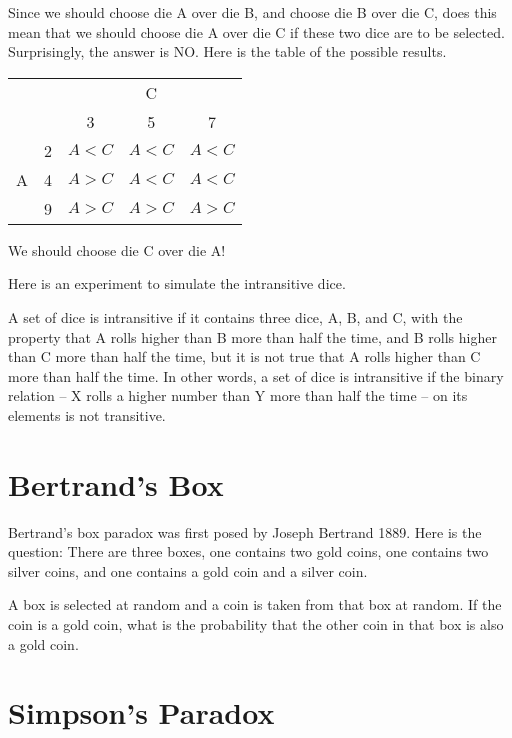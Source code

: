 Since we should choose die A over die B, and choose die B over die C, does this
mean that we should choose die A over die C if these two dice are to be
selected. Surprisingly, the answer is NO. Here is the table of the possible
results.
\begin{center}
  \begin{tabular}{cc|ccc}\hline
    &   & \multicolumn{3}{c}{C} \\
    &   & 3                & 5                & 7                \\ \hline
    \multirow{3}{*}{A}
    & 2 & $A<C$            & $A<C$            & $A<C$            \\
    & 4 & \color{red}$A>C$ & $A<C$            & $A<C$            \\
    & 9 & \color{red}$A>C$ & \color{red}$A>C$ & \color{red}$A>C$ \\\hline
  \end{tabular}
\end{center}
We should choose die C over die A!

Here is an experiment to simulate the intransitive dice.



A set of dice is intransitive if it contains three dice, A, B, and C, with the
property that A rolls higher than B more than half the time, and B rolls higher
than C more than half the time, but it is not true that A rolls higher than C
more than half the time. In other words, a set of dice is intransitive if the
binary relation – X rolls a higher number than Y more than half the time – on
its elements is not transitive.

\hypertarget{Bertrand-Box}{%
\section{Bertrand's Box}\label{Bertrand-Box}}

Bertrand's box paradox was first posed by Joseph Bertrand 1889. Here is the
question: There are three boxes, one contains two gold coins, one contains two
silver coins, and one contains a gold coin and a silver coin.

A box is selected at random and a coin is taken from that box at random. If the
coin is a gold coin, what is the probability that the other coin in that box is
also a gold coin.




\hypertarget{simpsons-paradox}{%
\section{Simpson's Paradox}\label{simpsons-paradox}}

